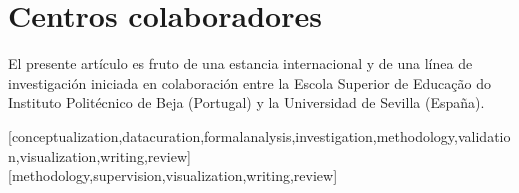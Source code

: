\documentclass[spanish]{textolivre}
\begin{document}
\section{Centros colaboradores}\label{sec-resumo}
El presente artículo es fruto de una estancia internacional y de una línea de investigación iniciada en colaboración entre la Escola Superior de Educação do Instituto Politécnico de Beja (Portugal) y la Universidad de Sevilla (España).



\printbibliography\label{sec-bib}
\begin{contributors}
[conceptualization,datacuration,formalanalysis,investigation,methodology,validation,visualization,writing,review]
[methodology,supervision,visualization,writing,review]
\end{contributors}
\end{document}
